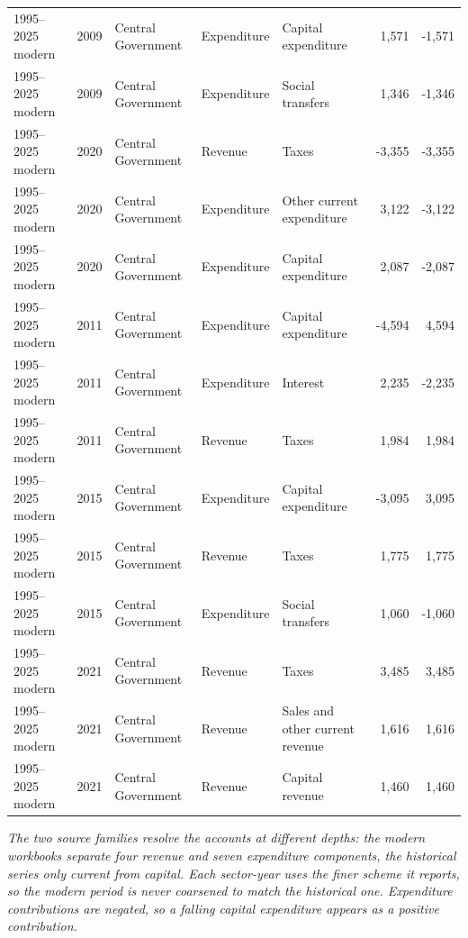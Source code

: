 \documentclass[11pt,a4paper]{article}
\begin{document}
\begin{table}[htbp]
{\begin{tabular}{@{}lrlllrr@{}}
1995--2025 modern & 2009 & Central Government & Expenditure & Capital expenditure & 1,571 & -1,571 \\
1995--2025 modern & 2009 & Central Government & Expenditure & Social transfers & 1,346 & -1,346 \\
1995--2025 modern & 2020 & Central Government & Revenue & Taxes & -3,355 & -3,355 \\
1995--2025 modern & 2020 & Central Government & Expenditure & Other current expenditure & 3,122 & -3,122 \\
1995--2025 modern & 2020 & Central Government & Expenditure & Capital expenditure & 2,087 & -2,087 \\
1995--2025 modern & 2011 & Central Government & Expenditure & Capital expenditure & -4,594 & 4,594 \\
1995--2025 modern & 2011 & Central Government & Expenditure & Interest & 2,235 & -2,235 \\
1995--2025 modern & 2011 & Central Government & Revenue & Taxes & 1,984 & 1,984 \\
1995--2025 modern & 2015 & Central Government & Expenditure & Capital expenditure & -3,095 & 3,095 \\
1995--2025 modern & 2015 & Central Government & Revenue & Taxes & 1,775 & 1,775 \\
1995--2025 modern & 2015 & Central Government & Expenditure & Social transfers & 1,060 & -1,060 \\
1995--2025 modern & 2021 & Central Government & Revenue & Taxes & 3,485 & 3,485 \\
1995--2025 modern & 2021 & Central Government & Revenue & Sales and other current revenue & 1,616 & 1,616 \\
1995--2025 modern & 2021 & Central Government & Revenue & Capital revenue & 1,460 & 1,460 \\
\bottomrule
\end{tabular}%
}
\par\smallskip
\begin{minipage}{\linewidth}\footnotesize\itshape The two source families resolve the accounts at different depths: the modern workbooks separate four revenue and seven expenditure components, the historical series only current from capital. Each sector-year uses the finer scheme it reports, so the modern period is never coarsened to match the historical one. Expenditure contributions are negated, so a falling capital expenditure appears as a positive contribution.\end{minipage}
\end{table}
\end{document}
